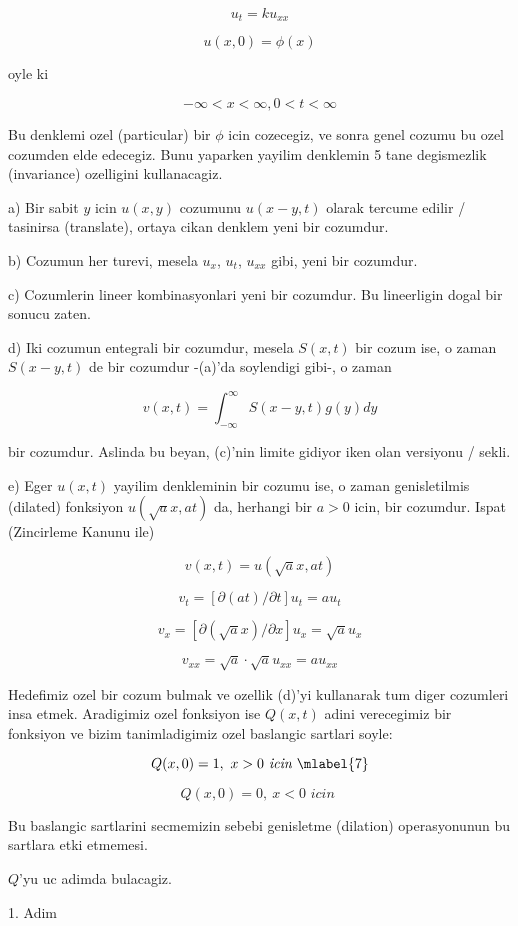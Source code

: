 \documentclass[12pt,fleqn]{article}\usepackage{../common}
\begin{document}
\[  u_t = k u_{xx}  \]

\[ u(x,0) = \phi(x) \]

oyle ki 

\[ -\infty < x < \infty, 0 < t < \infty \]

Bu denklemi ozel (particular) bir $\phi$ icin cozecegiz, ve sonra genel
cozumu bu ozel cozumden elde edecegiz. Bunu yaparken yayilim denklemin 5
tane degismezlik (invariance) ozelligini kullanacagiz.

a) Bir sabit $y$ icin $u(x,y)$ cozumunu $u(x-y,t)$ olarak tercume edilir /
tasinirsa (translate), ortaya cikan denklem yeni bir cozumdur.

b) Cozumun her turevi, mesela $u_x$, $u_t$, $u_{xx}$ gibi, yeni bir
cozumdur. 

c) Cozumlerin lineer kombinasyonlari yeni bir cozumdur. Bu lineerligin
dogal bir sonucu zaten.

d) Iki cozumun entegrali bir cozumdur, mesela $S(x,t)$ bir cozum ise, o
zaman $S(x-y,t)$ de bir cozumdur -(a)'da soylendigi gibi-, o zaman

\[ v(x,t) = \int_{-\infty}^{\infty}S(x-y,t)g(y) dy   \]

bir cozumdur. Aslinda bu beyan, (c)'nin limite gidiyor iken olan versiyonu
/ sekli.

e) Eger $u(x,t)$ yayilim denkleminin bir cozumu ise, o zaman genisletilmis
(dilated) fonksiyon $u(\sqrt{a} x, at)$ da, herhangi bir $a>0$ icin, bir
cozumdur. Ispat (Zincirleme Kanunu ile)

\[ v(x,t) =  u(\sqrt{a} x, at) \]

\[ v_t = [\partial(at) / \partial t]u_t = au_t \]

\[ v_x = [\partial(\sqrt{a}x) / \partial x]u_x = \sqrt{a}u_x \]

\[ v_{xx} = \sqrt{a} \cdot \sqrt{a} u_{xx} = a u_{xx} \]

Hedefimiz ozel bir cozum bulmak ve ozellik (d)'yi kullanarak tum diger
cozumleri insa etmek. Aradigimiz ozel fonksiyon ise $Q(x,t)$ adini
verecegimiz  bir fonksiyon ve bizim tanimladigimiz ozel baslangic
sartlari soyle:

\[ Q(x,0) = 1, \ x>0 \textit{ icin } 
\mlabel{7}\]

\[ Q(x,0)=0, \ x<0 \textit{ icin }  \]

Bu baslangic sartlarini secmemizin sebebi genisletme (dilation)
operasyonunun bu sartlara etki etmemesi. 

$Q$'yu uc adimda bulacagiz. 

1. Adim
\end{document}
